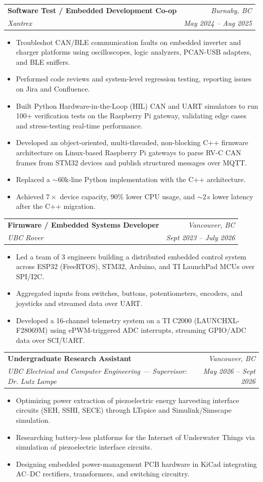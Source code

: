 \documentclass[letterpaper,11pt]{article}
\makeatletter
\newcommand{\resumeItem}[1]{
  \item\small{
    {#1 \vspace{-2pt}}
  }
}
\newcommand{\resumeSubheading}[4]{
  \vspace{-2pt}\item
    \begin{tabular*}{0.97\textwidth}[t]{l@{\extracolsep{\fill}}r}
      \textbf{#1} & \textit{\small #4} \\
      \textit{\small#3} & \textit{\small #2} \\
    \end{tabular*}\vspace{-7pt}
}
\newcommand{\resumeItemListStart}{\begin{itemize}[leftmargin=0.2in]}
\newcommand{\resumeItemListEnd}{\end{itemize}\vspace{-5pt}}
\makeatother
\begin{document}
\resumeSubheading
      {Software Test / Embedded Development Co-op}{May 2024 -- Aug 2025}
      {Xantrex}{Burnaby, BC}
      \resumeItemListStart
        \resumeItem{Troubleshot CAN/BLE communication faults on embedded inverter and charger platforms using oscilloscopes, logic analyzers, PCAN-USB adapters, and BLE sniffers.}
        \resumeItem{Performed code reviews and system-level regression testing, reporting issues on Jira and Confluence.}
        \resumeItem{Built Python Hardware-in-the-Loop (HIL) CAN and UART simulators to run 100+ verification tests on the Raspberry Pi gateway, validating edge cases and stress-testing real-time performance.}
        \resumeItem{Developed an object-oriented, multi-threaded, non-blocking C++ firmware architecture on Linux-based Raspberry Pi gateways to parse RV-C CAN frames from STM32 devices and publish structured messages over MQTT.}
        \resumeItem{Replaced a $\sim$60k-line Python implementation with the C++ architecture.}
        \resumeItem{Achieved $7\times$ device capacity, 90\% lower CPU usage, and $\sim$2\,s lower latency after the C++ migration.}
      \resumeItemListEnd

    \resumeSubheading
      {Firmware / Embedded Systems Developer}{Sept 2023 -- July 2026}
      {UBC Rover}{Vancouver, BC}
      \resumeItemListStart
        \resumeItem{Led a team of 3 engineers building a distributed embedded control system across ESP32 (FreeRTOS), STM32, Arduino, and TI LaunchPad MCUs over SPI/I2C.}
        \resumeItem{Aggregated inputs from switches, buttons, potentiometers, encoders, and joysticks and streamed data over UART.}
        \resumeItem{Developed a 16-channel telemetry system on a TI C2000 (LAUNCHXL-F28069M) using ePWM-triggered ADC interrupts, streaming GPIO/ADC data over SCI/UART.}
      \resumeItemListEnd

    \resumeSubheading
      {Undergraduate Research Assistant}{May 2026 -- Sept 2026}
      {UBC Electrical and Computer Engineering --- Supervisor: Dr. Lutz Lampe}{Vancouver, BC}
      \resumeItemListStart
        \resumeItem{Optimizing power extraction of piezoelectric energy harvesting interface circuits (SEH, SSHI, SECE) through LTspice and Simulink/Simscape simulation.}
        \resumeItem{Researching battery-less platforms for the Internet of Underwater Things via simulation of piezoelectric interface circuits.}
        \resumeItem{Designing embedded power-management PCB hardware in KiCad integrating AC--DC rectifiers, transformers, and switching circuitry.}
      \resumeItemListEnd
\end{document}
